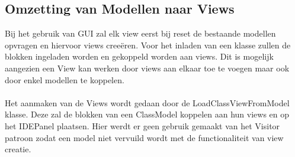 \documentclass[]{article}
\begin{document}
\subsection{Omzetting van Modellen naar Views}
Bij het gebruik van GUI zal elk view eerst bij reset de bestaande modellen opvragen en hiervoor views cree\"{e}ren. Voor het inladen van een klasse zullen de blokken ingeladen worden en gekoppeld worden aan views. Dit is mogelijk aangezien een View kan werken door views aan elkaar toe te voegen maar ook door enkel modellen te koppelen.\\\\ Het aanmaken van de Views wordt gedaan door de LoadClassViewFromModel klasse. Deze zal de blokken van een ClassModel koppelen aan hun views en op het IDEPanel plaatsen. Hier werdt er geen gebruik gemaakt van het Visitor patroon zodat een model niet vervuild wordt met de functionaliteit van view creatie.
\end{document}
